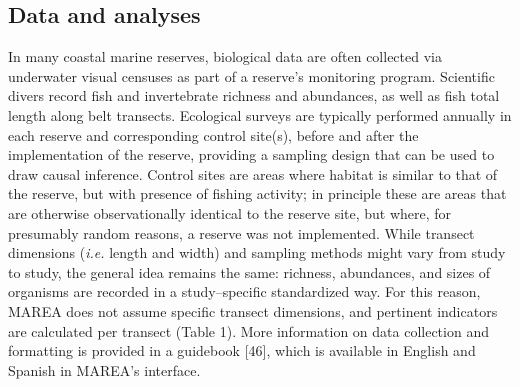 \documentclass[12pt,]{article}
\begin{document}
\begin{table}

\caption{\label{tab:unnamed-chunk-3}Management objectives and respective performance indicators.}
\centering
{}
\end{table}

\subsection{Data and analyses}\label{data-and-analyses}

In many coastal marine reserves, biological data are often collected via
underwater visual censuses as part of a reserve's monitoring program.
Scientific divers record fish and invertebrate richness and abundances,
as well as fish total length along belt transects. Ecological surveys
are typically performed annually in each reserve and corresponding
control site(s), before and after the implementation of the reserve,
providing a sampling design that can be used to draw causal inference.
Control sites are areas where habitat is similar to that of the reserve,
but with presence of fishing activity; in principle these are areas that
are otherwise observationally identical to the reserve site, but where,
for presumably random reasons, a reserve was not implemented. While
transect dimensions (\emph{i.e.} length and width) and sampling methods
might vary from study to study, the general idea remains the same:
richness, abundances, and sizes of organisms are recorded in a
study--specific standardized way. For this reason, MAREA does not assume
specific transect dimensions, and pertinent indicators are calculated
per transect (Table 1). More information on data collection and
formatting is provided in a guidebook {[}46{]}, which is available in
English and Spanish in MAREA's interface.
\end{document}
